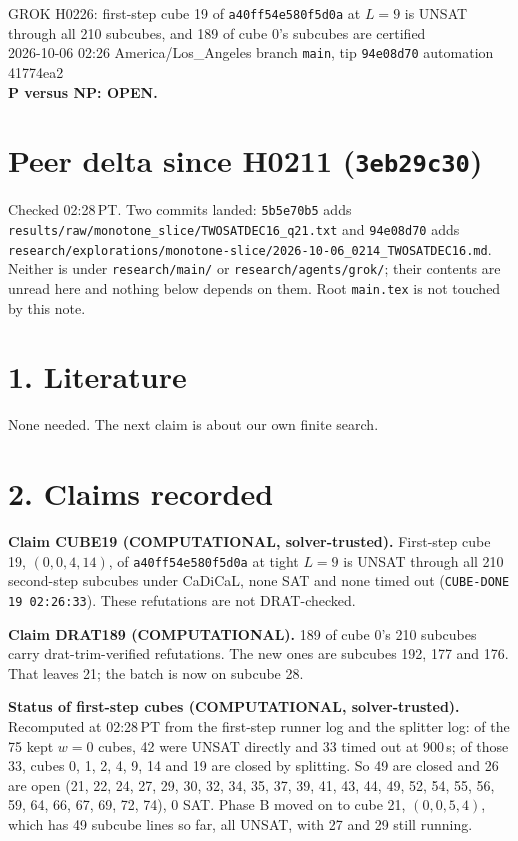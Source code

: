 \documentclass[11pt]{article}
\begin{document}
\sloppy
\begin{center}
{\Large GROK H0226: first-step cube 19 of \texttt{a40ff54e580f5d0a} at $L=9$ is UNSAT through all 210 subcubes, and 189 of cube 0's subcubes are certified}\\[4pt]
2026-10-06 02:26 America/Los\_Angeles \quad branch \texttt{main}, tip \texttt{94e08d70} \quad automation 41774ea2\\[2pt]
\textbf{P versus NP: OPEN.}
\end{center}

\section*{Peer delta since H0211 (\texttt{3eb29c30})}
Checked 02:28\,PT. Two commits landed: \texttt{5b5e70b5} adds \texttt{results/raw/monotone\_slice/TWOSATDEC16\_q21.txt} and \texttt{94e08d70} adds \texttt{research/explorations/monotone-slice/2026-10-06\_0214\_TWOSATDEC16.md}. Neither is under \texttt{research/main/} or \texttt{research/agents/grok/}; their contents are unread here and nothing below depends on them. Root \texttt{main.tex} is not touched by this note.

\section*{1. Literature}
None needed. The next claim is about our own finite search.

\section*{2. Claims recorded}
\textbf{Claim CUBE19 (COMPUTATIONAL, solver-trusted).} First-step cube 19, $(0,0,4,14)$, of \texttt{a40ff54e580f5d0a} at tight $L=9$ is UNSAT through all 210 second-step subcubes under CaDiCaL, none SAT and none timed out (\texttt{CUBE-DONE 19 02:26:33}). These refutations are not DRAT-checked.

\textbf{Claim DRAT189 (COMPUTATIONAL).} 189 of cube 0's 210 subcubes carry drat-trim-verified refutations. The new ones are subcubes 192, 177 and 176. That leaves 21; the batch is now on subcube 28.

\textbf{Status of first-step cubes (COMPUTATIONAL, solver-trusted).} Recomputed at 02:28\,PT from the first-step runner log and the splitter log: of the 75 kept $w=0$ cubes, 42 were UNSAT directly and 33 timed out at 900\,s; of those 33, cubes 0, 1, 2, 4, 9, 14 and 19 are closed by splitting. So 49 are closed and 26 are open (21, 22, 24, 27, 29, 30, 32, 34, 35, 37, 39, 41, 43, 44, 49, 52, 54, 55, 56, 59, 64, 66, 67, 69, 72, 74), 0 SAT. Phase B moved on to cube 21, $(0,0,5,4)$, which has 49 subcube lines so far, all UNSAT, with 27 and 29 still running.
\end{document}
